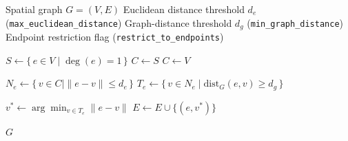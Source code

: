 \documentclass[english,12pt,a4paper]{article}
\begin{document}
	
	\begin{algorithm}[H]
		\caption{Repair Connectivity}
		\begin{algorithmic}[1]
			\Require Spatial graph $G=(V,E)$
			\Require Euclidean distance threshold $d_e$ (\texttt{max\_euclidean\_distance})
			\Require Graph-distance threshold $d_g$ (\texttt{min\_graph\_distance})
			\Require Endpoint restriction flag (\texttt{restrict\_to\_endpoints})
			
			\Statex
			
			\State $S \gets \{\, e \in V \mid \deg(e)=1 \,\}$ 
			\State $C \gets S$
			\Else
			\State $C \gets V$
			\EndIf
			
			\State $N_e \gets \{\, v \in C \mid \|e-v\| \leq d_e \,\}$ 
			\State $T_e \gets \{\, v \in N_e \mid \mathrm{dist}_G(e,v) \geq d_g \,\}$ 
			
			\State $v^* \gets \arg\min_{v \in T_e} \|e-v\|$
			\State $E \gets E \cup \{(e,v^*)\}$
			\EndIf
			\EndFor
			
			\State \Return $G$
		\end{algorithmic}
	\end{algorithm}
	
\end{document}
